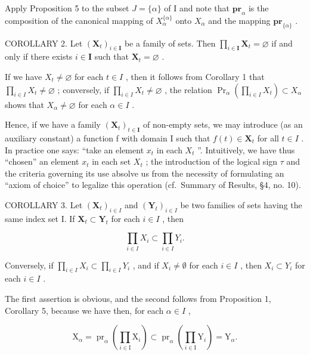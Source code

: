 Apply Proposition 5 to the subset \(J = \{\alpha\}\) of I and note that \(\mathbf{pr}_{\alpha}\) is the composition of the canonical mapping of \(X_{\alpha}^{\{\alpha\}}\) onto \(X_{\alpha}\) and the mapping \(\mathbf{pr}_{\{\alpha\}}\) .

COROLLARY 2. Let \((\mathbf{X}_t)_{i \in \mathbf{I}}\) be a family of sets. Then \(\prod_{i \in \mathbf{I}} \mathbf{X}_t = \varnothing\) if and only if there exists \(i \in \mathbf{I}\) such that \(\mathbf{X}_t = \varnothing\) .

If we have \(X_{t} \neq \varnothing\) for each \(t \in I\) , then it follows from Corollary 1 that \(\prod_{i \in I} X_{t} \neq \varnothing\) ; conversely, if \(\prod_{i \in I} X_{t} \neq \varnothing\) , the relation \(\Pr_{\alpha}\left(\prod_{i \in I} X_{t}\right) \subset X_{\alpha}\) shows that \(X_{\alpha} \neq \varnothing\) for each \(\alpha \in I\) .

Hence, if we have a family \((\mathbf{X}_{t})_{t\in\mathbf{I}}\) of non-empty sets, we may introduce (as an auxiliary constant) a function f with domain I such that \(f(t)\in\mathbf{X}_{t}\) for all \(t\in I\) . In practice one says: ``take an element \(x_{t}\) in each \(X_{t}\) ''. Intuitively, we have thus ``chosen'' an element \(x_{t}\) in each set \(X_{t}\) ; the introduction of the logical sign \(\tau\) and the criteria governing its use absolve us from the necessity of formulating an ``axiom of choice'' to legalize this operation (cf.~Summary of Results, §4, no. 10).

COROLLARY 3. Let \((\mathbf{X}_t)_{i\in I}\) and \((\mathbf{Y}_t)_{i\in I}\) be two families of sets having the same index set I. If \(\mathbf{X}_t\subset \mathbf{Y}_t\) for each \(i\in I\) , then

\[
\prod_ {i \in I} X _ {i} \subset \prod_ {i \in I} Y _ {i}.
\]

Conversely, if \(\prod_{i\in I}X_i\subset \prod_{i\in I}Y_i\) , and if \(X_{i}\neq \emptyset\) for each \(i\in I\) , then \(X_{i}\subset Y_{i}\) for each \(i\in I\) .

The first assertion is obvious, and the second follows from Proposition 1, Corollary 5, because we have then, for each \(\alpha \in I\) ,

\[
\mathrm{X} _ {\alpha} = \operatorname{pr} _ {\alpha} \left(\prod_ {i \in \mathrm{I}} \mathrm{X} _ {i}\right) \subset \operatorname{pr} _ {\alpha} \left(\prod_ {i \in \mathrm{I}} \mathrm{Y} _ {i}\right) = \mathrm{Y} _ {\alpha}.
\]

